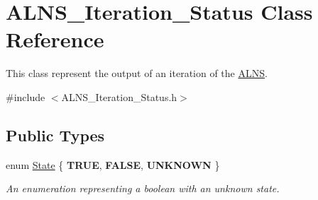 \hypertarget{classALNS__Iteration__Status}{\section{A\-L\-N\-S\-\_\-\-Iteration\-\_\-\-Status Class Reference}
\label{classALNS__Iteration__Status}
}


This class represent the output of an iteration of the \hyperlink{classALNS}{A\-L\-N\-S}.  




{\ttfamily \#include $<$A\-L\-N\-S\-\_\-\-Iteration\-\_\-\-Status.\-h$>$}

\subsection*{Public Types}
\begin{DoxyCompactItemize}
\item 
enum \hyperlink{classALNS__Iteration__Status_a6d748b05080edeab9e82ac32c9904133}{State} \{ {\bfseries T\-R\-U\-E}, 
{\bfseries F\-A\-L\-S\-E}, 
{\bfseries U\-N\-K\-N\-O\-W\-N}
 \}
\begin{DoxyCompactList}\small\item\em An enumeration representing a boolean with an unknown state. \end{DoxyCompactList}\end{DoxyCompactItemize}
